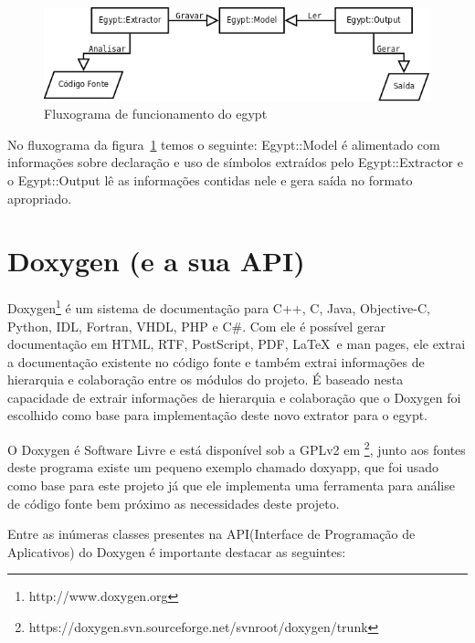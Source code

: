 \begin{figure}[h]
\center
\includegraphics[scale=0.4]{imagens/egypt-fluxogram}
\caption{Fluxograma de funcionamento do egypt}
\label{egypt-fluxogram}
\end{figure}

No fluxograma da figura~\ref{egypt-fluxogram} temos o seguinte: Egypt::Model é
alimentado com informações sobre declaração e uso de símbolos extraídos pelo
Egypt::Extractor e o Egypt::Output lê as informações contidas nele e gera saída
no formato apropriado.

\section{Doxygen (e a sua API)}

Doxygen\footnote{http://www.doxygen.org} é um sistema de documentação para C++,
C, Java, Objective-C, Python, IDL,
Fortran, VHDL, PHP e C\#. Com ele é possível gerar documentação em
HTML, RTF,
PostScript, PDF, \LaTeX\ e man pages, ele
extrai a documentação existente no código fonte e também extrai informações de
hierarquia e colaboração entre os módulos do projeto. É baseado nesta
capacidade de extrair informações de hierarquia e colaboração que o Doxygen foi
escolhido como base para implementação deste novo extrator para o egypt.

O Doxygen é Software Livre e está disponível sob a GPLv2 em
\footnote{https://doxygen.svn.sourceforge.net/svnroot/doxygen/trunk}, junto aos
fontes deste programa existe um pequeno exemplo chamado doxyapp, que foi usado
como base para este projeto já que ele implementa uma ferramenta para análise
de código fonte bem próximo as necessidades deste projeto.

Entre as inúmeras classes presentes na API(Interface de Programação de Aplicativos) do Doxygen é importante
destacar as seguintes:

